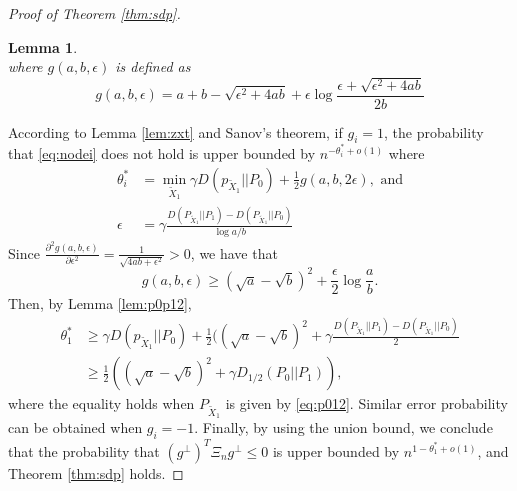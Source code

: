 \documentclass[conference]{IEEEtran}
\newtheorem{lemma}{Lemma}
\newtheorem{corollary}{Corollary}
\DeclareMathOperator{\SDP}{SDP}
\begin{document}
\begin{proof}[Proof of Theorem \ref{thm:sdp}]
\begin{lemma}
\begin{equation}
		\end{equation}
		where $g(a,b,\epsilon)$ is defined as
		\begin{equation}\label{eq:gab}
			g(a,b,\epsilon) = a + b - \sqrt{\epsilon^2 + 4ab} + \epsilon \log \frac{\epsilon + \sqrt{\epsilon^2 + 4ab}}{2b}
		\end{equation}
	\end{lemma}
	According to Lemma \ref{lem:zxt} and Sanov's theorem, if $g_i=1$, the probability that \eqref{eq:nodei} does not hold is upper bounded by
	$n^{-\theta^*_i + o(1)}$ where
	\begin{align}
		\theta^*_i &= \min_{\widetilde{X}_1} \gamma D(p_{\widetilde{X}_1}|| P_0)+ \frac{1}{2} g(a,b, 2\epsilon) \label{eq:theta_star2},\mbox{ and} \nonumber\\
		\epsilon &= \gamma \frac{D(P_{\widetilde{X}_1} || P_1) - D(P_{\widetilde{X}_1} || P_0) }{\log a /b}
	\end{align}
	Since $\frac{\partial^2 g(a,b,\epsilon)}{\partial \epsilon^2} =\frac{1}{\sqrt{4ab+\epsilon^2}}> 0$, we have that
	\begin{equation}\label{eq:g_linear}
		g(a,b,\epsilon) \geq  (\sqrt{a} - \sqrt{b})^2 + \frac{\epsilon}{2}\log \frac{a}{b}. 
	\end{equation}
	Then, by Lemma \ref{lem:p0p12},
	\begin{align*}
		\theta^*_1 &\geq \gamma D(p_{\widetilde{X}_1}|| P_0) +\frac{1}{2}((\sqrt{a}-\sqrt{b})^2 +\gamma \frac{D(P_{\widetilde{X}_1} || P_1) - D(P_{\widetilde{X}_1} || P_0)}{2}
		\\&\geq \frac{1}{2}((\sqrt{a}-\sqrt{b})^2+\gamma D_{1/2}(P_0||P_1)),
	\end{align*}
	where the equality holds when $P_{\widetilde{X}_1}$ is given by \eqref{eq:p012}. 
	Similar error probability can be obtained when $g_i=-1$. Finally,
	by using the union bound, we conclude that the probability that $(g^{\perp})^T \Xi_n g^{\perp}\le 0$ is upper bounded by $n^{1-\theta_1^*+o(1)}$, and Theorem \ref{thm:sdp} holds.
\end{proof}
\end{document}
